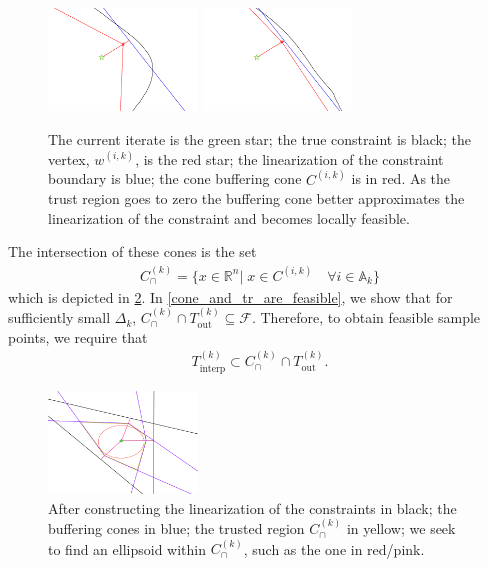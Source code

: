 \documentclass{article}
\theoremstyle{case}
\numberwithin{theorem}{subsection}
\newcommand{\activeconstraintsk}{{\mathbb A_{k}}}
\newcommand{\capcones}{{C^{(k)}_{\cap}}}
\newcommand{\dk}{\Delta_k}
\newcommand{\feasible}{{\mathcal F}}
\newcommand{\outertrk}{{T_{\text{out}}^{(k)}}}
\newcommand{\Rn}{\mathbb R^n}
\newcommand{\sampletrk}{{T_{\text{interp}}^{(k)}}}
\newcommand{\wik}{{w^{(i, k)}}}
\newcommand{\fik}{{C^{(i, k)}}}
\begin{document}
\begin{figure}[ht]
    \centering
    \includegraphics[width=150px]{images/explanation_2.png}
    \includegraphics[width=150px]{images/explanation_3.png}
    \caption{
    	The current iterate is the green star;
    	the true constraint is black;
    	the vertex, $\wik$, is the red star;
    	the linearization of the constraint boundary is blue;
    	the cone buffering cone $\fik$ is in red.
    	As the trust region goes to zero the buffering cone better approximates the linearization of the constraint and becomes locally feasible.
	}
    \label{explanation_2}
\end{figure}
The intersection of these cones is the set
\begin{align}
\capcones = \{x\in\Rn | \; x \in \fik \quad \forall i \in \activeconstraintsk \} \label{define_capcones}
\end{align}
which is depicted in \cref{completed_2}.
In \cref{cone_and_tr_are_feasible}, we show that for sufficiently small $\dk$, $\capcones \cap \outertrk \subseteq \feasible$.
\color{red}
Therefore, to obtain feasible sample points, we require that 
\begin{align*}
\sampletrk \subset \capcones \cap \outertrk.
\end{align*}
\color{black}




\begin{figure}[ht]
    \centering
    \includegraphics[width=150px]{images/completed_2.png}
    \caption{
    	After constructing 
    	the linearization of the constraints in black;
    	the buffering cones in blue;
    	the trusted region $\capcones$ in yellow;
    	we seek to find an ellipsoid within $\capcones$, such as the one in red/pink.
	}
    \label{completed_2}
\end{figure}
\end{document}
